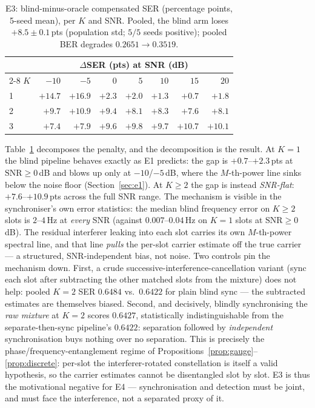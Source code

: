 \documentclass[journal]{IEEEtran}
\newcommand{\snr}{\mathrm{SNR}}
\begin{document}
\begin{table}[!t]
\centering
\caption{E3: blind-minus-oracle compensated SER (percentage points,
5-seed mean), per $K$ and SNR. Pooled, the blind arm loses
$+8.5 \pm 0.1$\,pts (population std; $5/5$ seeds positive);
pooled BER degrades $0.2651 \to 0.3519$.}
\label{tab:e3}
\scriptsize
\begin{tabular}{lrrrrrrr}
\toprule
& \multicolumn{7}{c}{$\Delta$SER (pts) at SNR (dB)} \\
\cmidrule(lr){2-8}
$K$ & $-10$ & $-5$ & $0$ & $5$ & $10$ & $15$ & $20$ \\
\midrule
1 & $+14.7$ & $+16.9$ & $+2.3$ & $+2.0$ & $+1.3$ & $+0.7$ & $+1.8$ \\
2 & $+9.7$ & $+10.9$ & $+9.4$ & $+8.1$ & $+8.3$ & $+7.6$ & $+8.1$ \\
3 & $+7.4$ & $+7.9$ & $+9.6$ & $+9.8$ & $+9.7$ & $+10.7$ & $+10.1$ \\
\bottomrule
\end{tabular}
\end{table}

Table~\ref{tab:e3} decomposes the penalty, and the decomposition is the
result. At $K{=}1$ the blind pipeline behaves exactly as E1 predicts:
the gap is $+0.7$--$+2.3$\,pts at $\snr \geq 0$\,dB and blows up only
at $-10$/$-5$\,dB, where the $M$-th-power line sinks below the noise
floor (Section~\ref{sec:e1}). At $K \geq 2$ the gap is instead
\emph{SNR-flat}: $+7.6$--$+10.9$\,pts across the full SNR range. The mechanism is visible in the synchroniser's own error
statistics: the median blind frequency error on $K \geq 2$ slots is
$2$--$4$\,Hz at \emph{every} SNR (against $0.007$--$0.04$\,Hz on
$K{=}1$ slots at $\snr \geq 0$\,dB). The residual interferer leaking
into each slot
carries its own $M$-th-power spectral line, and that line \emph{pulls}
the per-slot carrier estimate off the true carrier --- a structured,
SNR-independent bias, not noise. Two controls pin the mechanism down.
First, a crude successive-interference-cancellation variant (sync each
slot after subtracting the other matched slots from the mixture) does
not help: pooled $K{=}2$ SER $0.6484$ vs.\ $0.6422$ for plain blind
sync --- the subtracted estimates are themselves biased. Second, and
decisively, blindly synchronising the \emph{raw mixture} at $K{=}2$
scores $0.6427$, statistically indistinguishable from the
separate-then-sync pipeline's $0.6422$: separation followed by
\emph{independent} synchronisation buys nothing over no separation.
This is precisely the phase/frequency-entanglement regime of
Propositions~\ref{prop:gauge}--\ref{prop:discrete}: per-slot the
interferer-rotated constellation is itself a valid hypothesis, so the
carrier estimates cannot be disentangled slot by slot. E3 is thus the
motivational negative for E4 --- synchronisation and detection must be
joint, and must face the interference, not a separated proxy of it.
\end{document}
